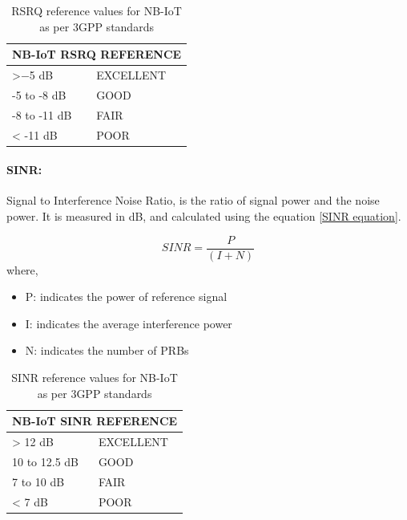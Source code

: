 \documentclass[12pt]{article}
\begin{document}
\begin{table}[!h]
\caption {RSRQ reference values for NB-IoT as per 3GPP standards\cite{3GPP,sikora2019performance}}
\centering

\begin{tabular}{|p{5cm}|p{5cm}|}
\hline
\multicolumn{2}{|c|}{NB-IoT RSRQ REFERENCE} \\ \hline
>−5 dB                 & EXCELLENT          \\ \hline
-5 to -8 dB            & GOOD               \\ \hline
-8 to -11 dB           & FAIR               \\ \hline
< -11 dB               & POOR               \\ \hline
\end{tabular}

\label{nbiotRSRQ}
\end{table}

\paragraph{SINR:} Signal to Interference Noise Ratio, is the ratio of signal power and the noise power. It is measured in dB, and calculated using the equation \ref{SINR equation}. \par

\begin{equation}
       SINR={\dfrac{P}{(I+N)}}
     \label{SINR equation}
\end{equation}
where, 
\begin{itemize}
    \item P: indicates the power of reference signal
    \item I: indicates the average interference power
    \item N: indicates the number of PRBs
\end{itemize}

\begin{table}[H]
\caption {SINR reference values for NB-IoT as per 3GPP standards\cite{3GPP,sikora2019performance}}
\centering

\begin{tabular}{|p{5cm}|p{5cm}|}
\hline
\multicolumn{2}{|c|}{NB-IoT SINR REFERENCE} \\ \hline
> 12 dB                 & EXCELLENT          \\ \hline
10 to 12.5 dB            & GOOD               \\ \hline
7 to 10 dB           & FAIR               \\ \hline
< 7 dB               & POOR               \\ \hline
\end{tabular}

\label{nbiotSINR}
\end{table}
\end{document}
